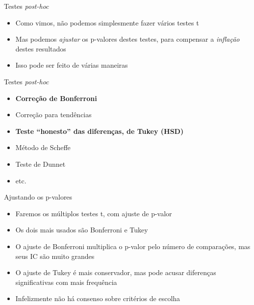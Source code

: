 \documentclass{beamer}
\begin{document}
\begin{frame}{Testes {\em post-hoc}}
  \begin{itemize}
    \footnotesize
  \item Como vimos, não podemos simplesmente fazer vários testes t
    \bigskip
    \bigskip
  \item Mas podemos {\em ajustar} os p-valores destes testes, para compensar a {\em inflação} destes resultados
    \bigskip
    \bigskip
  \item Isso pode ser feito de várias maneiras
  \end{itemize}
\end{frame}

\begin{frame}{Testes {\em post-hoc}}
  \begin{itemize}
    \small
  \item {\bf Correção de Bonferroni}
  \item Correção para tendências
  \item {\bf Teste ``honesto'' das diferenças, de Tukey (HSD)}
  \item Método de Scheffe
  \item Teste de Dunnet
  \item etc.
  \end{itemize}
\end{frame}

\begin{frame}{Ajustando os p-valores}
  \begin{itemize}
    \footnotesize
  \item Faremos os múltiplos testes t, com ajuste de p-valor
  \item Os dois mais usados são Bonferroni e Tukey
    \bigskip
    \bigskip
 \item O ajuste de Bonferroni multiplica o p-valor pelo número de comparações, mas seus IC são muito grandes
    \bigskip
 \item O ajuste de Tukey é mais conservador, mas pode acusar diferenças significativas com mais frequência
    \bigskip
    \bigskip
 \item Infelizmente não há consenso sobre critérios de escolha
  \end{itemize}
\end{frame}
\end{document}
